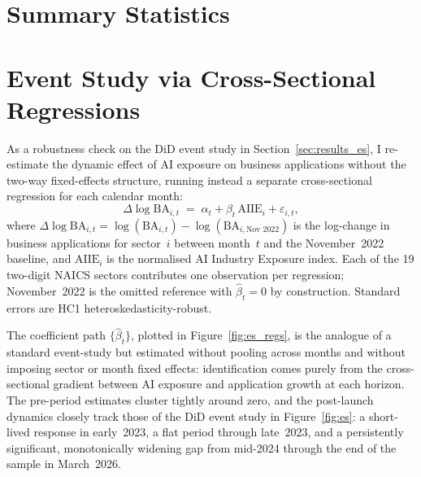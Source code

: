 \documentclass[12pt]{article}
\begin{document}




\begin{landscape}

\end{landscape}

\section{Summary Statistics}
\label{app:summary}



\section{Event Study via Cross-Sectional Regressions}
\label{app:es_regs}

As a robustness check on the DiD event study in
Section~\ref{sec:results_es}, I re-estimate the dynamic effect of AI
exposure on business applications without the two-way fixed-effects
structure, running instead a separate cross-sectional regression for
each calendar month:
\begin{equation}
  \Delta\log\text{BA}_{i,t} \;=\; \alpha_t + \beta_t\,\text{AIIE}_i
                              + \varepsilon_{i,t},
  \label{eq:es_regs}
\end{equation}
where $\Delta\log\text{BA}_{i,t} = \log(\text{BA}_{i,t}) -
\log(\text{BA}_{i,\text{Nov 2022}})$ is the log-change in business
applications for sector~$i$ between month~$t$ and the November~2022
baseline, and $\text{AIIE}_i$ is the normalised AI Industry Exposure
index. Each of the 19 two-digit NAICS sectors contributes one
observation per regression; November~2022 is the omitted reference with
$\widehat{\beta}_t = 0$ by construction. Standard errors are HC1
heteroskedasticity-robust.

The coefficient path $\{\widehat{\beta}_t\}$, plotted in
Figure~\ref{fig:es_regs}, is the analogue of a standard event-study
but estimated without pooling across months and without imposing
sector or month fixed effects: identification comes purely from the
cross-sectional gradient between AI exposure and application growth
at each horizon. The pre-period estimates cluster tightly around zero,
and the post-launch dynamics closely track those of the DiD event study
in Figure~\ref{fig:es}: a short-lived response in early~2023, a flat
period through late~2023, and a persistently significant, monotonically
widening gap from mid-2024 through the end of the sample in
March~2026.
\end{document}
